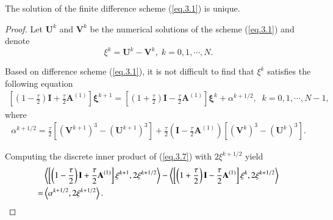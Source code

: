 \documentclass{siamart171218}
\numberwithin{theorem}{section}
\numberwithin{equation}{section}
\begin{document}
\begin{theorem}
The solution of the  finite difference scheme (\ref{eq.3.1}) is unique.
\end{theorem}

\begin{proof}
Let $\mathbf{U}^k$ and $\mathbf{V}^k$ be the numerical solutions of the scheme (\ref{eq.3.1}) and denote
$$\xi^k=\mathbf{U}^k-\mathbf{V}^k,\;k=0,1,\cdots,N.$$

Based on difference scheme (\ref{eq.3.1}), it is not difficult to find that $\xi^k$ satisfies the following equation
\begin{equation}\label{eq.3.7}
\begin{aligned}\displaystyle
\left[\left(1-\frac{\tau}{2}\right)\mathbf{I}+\frac{\tau}{2}\mathbf{A}^{(1)}
\right]\mathbf{\xi}^{k+1}=\left[\left(1+\frac{\tau}{2}\right)\mathbf{I}-\frac{\tau}{2}\mathbf{A}^{(1)}
\right]\mathbf{\xi}^{k}+\alpha^{k+1/2}
,\;\;k=0,1,\cdots,N-1,
\end{aligned}
\end{equation}
where
\begin{equation*}
\begin{aligned}\displaystyle
\alpha^{k+1/2}=\frac{\tau}{2}\left[\left(\mathbf{V}^{k+1}\right)^3
-\left(\mathbf{U}^{k+1}\right)^3\right]
+\frac{\tau}{2}\left(
\mathbf{I}-\frac{\tau}{2}\mathbf{A}^{(1)}
\right)\left[\left(\mathbf{V}^{k}\right)^3-\left(\mathbf{U}^{k}\right)^3\right].
\end{aligned}
\end{equation*}

Computing the discrete inner product of (\ref{eq.3.7}) with $2\xi^{k+1/2}$ yield
\begin{equation}\label{eq.3.8}
\begin{aligned}\displaystyle
&\left\langle\left[\left(1-\frac{\tau}{2}\right)\mathbf{I}+\frac{\tau}{2}\mathbf{A}^{(1)}
\right]\mathbf{\xi}^{k+1},2\xi^{k+1/2}\right\rangle
-\left\langle\left[\left(1+\frac{\tau}{2}\right)\mathbf{I}-\frac{\tau}{2}\mathbf{A}^{(1)}
\right]\mathbf{\xi}^{k},2\xi^{k+1/2}\right\rangle\\
=&\left\langle\alpha^{k+1/2},2\xi^{k+1/2}\right\rangle.
\end{aligned}
\end{equation}


\end{proof}
\end{document}
